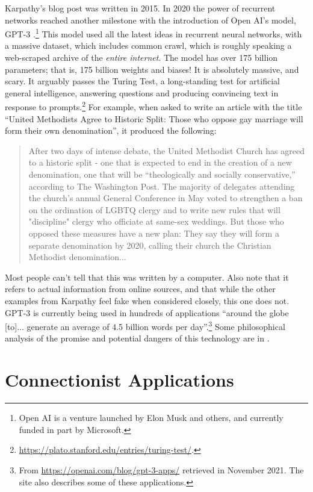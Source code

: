 Karpathy's blog post was written in 2015. In 2020 the power of recurrent networks reached another milestone with the introduction of Open AI's model, GPT-3 \cite{brown2020language, floridi2020gpt}.\footnote{Open AI is a venture launched by Elon Musk and others, and currently funded in part by Microsoft.} This model used all the latest ideas in recurrent neural networks, with a massive dataset, which includes common crawl, which is roughly speaking a web-scraped archive of the \emph{entire internet}. The model has over 175 billion parameters; that is, 175 billion weights and biases! It is absolutely massive, and scary. It arguably passes the Turing Test, a long-standing test for artificial general intelligence, answering questions and producing convincing  text in response to prompts.\footnote{\url{https://plato.stanford.edu/entries/turing-test/}.} For example, when asked to write an article with the title ``United Methodists Agree to Historic Split: Those who oppose gay marriage will form their own denomination'', it produced the following:
\begin{quote}
After two days of intense debate, the United Methodist Church has agreed to a historic split - one that is expected to end in the creation of a new denomination, one that will be ``theologically and socially conservative,'' according to The Washington Post. The majority of delegates attending the church's annual General Conference in May voted to strengthen a ban on the ordination of LGBTQ clergy and to write new rules that will "discipline" clergy who officiate at same-sex weddings. But those who opposed these measures have a new plan: They say they will form a separate denomination by 2020, calling their church the Christian Methodist denomination...
\end{quote}
Most people can't tell that this was written by a computer. Also note that it refers to actual information from online sources,  and that while the other examples from Karpathy feel fake when considered closely, this one does not. GPT-3 is currently being used in hundreds of applications ``around the globe [to]... generate an average of 4.5 billion words per day''.\footnote{From \url{https://openai.com/blog/gpt-3-apps/} retrieved in November 2021. The site also describes some of these applications.} Some philosophical analysis of the promise and potential dangers of this technology are in \cite{floridi2020gpt}.

\section{Connectionist Applications}

